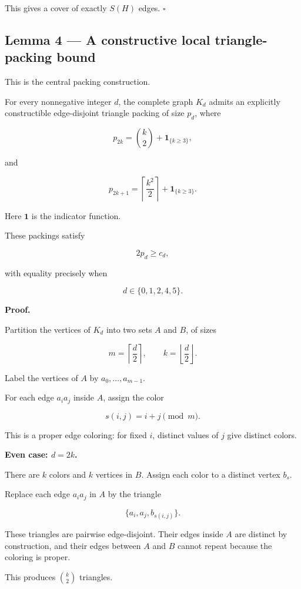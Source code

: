 \documentclass[11pt]{article}
\begin{document}
This gives a cover of exactly \(S(H)\) edges. \(\square\)

\subsection{Lemma 4 --- A constructive local triangle-packing bound}

This is the central packing construction.

For every nonnegative integer \(d\), the complete graph \(K_d\) admits an explicitly constructible edge-disjoint triangle packing of size \(p_d\), where

\[
p_{2k}=\binom{k}{2}+\mathbf1_{\{k\geq3\}},
\]

and

\[
p_{2k+1}=
\left\lceil\frac{k^2}{2}\right\rceil+
\mathbf1_{\{k\geq3\}}.
\]

Here \(\mathbf1\) is the indicator function.

These packings satisfy

\[
2p_d\geq c_d,
\]

with equality precisely when

\[
d\in\{0,1,2,4,5\}.
\]

\textbf{Proof.}

Partition the vertices of \(K_d\) into two sets \(A\) and \(B\), of sizes

\[
m=\left\lceil\frac d2\right\rceil,\qquad
k=\left\lfloor\frac d2\right\rfloor.
\]

Label the vertices of \(A\) by \(a_0,\ldots,a_{m-1}\).

For each edge \(a_i a_j\) inside \(A\), assign the color

\[
s(i,j)=i+j\pmod m.
\]

This is a proper edge coloring: for fixed \(i\), distinct values of \(j\) give distinct colors.

\textbf{Even case: \(d=2k\).}

There are \(k\) colors and \(k\) vertices in \(B\). Assign each color to a distinct vertex \(b_s\).

Replace each edge \(a_i a_j\) in \(A\) by the triangle

\[
\{a_i,a_j,b_{s(i,j)}\}.
\]

These triangles are pairwise edge-disjoint. Their edges inside \(A\) are distinct by construction, and their edges between \(A\) and \(B\) cannot repeat because the coloring is proper.

This produces \(\binom{k}{2}\) triangles.
\end{document}
